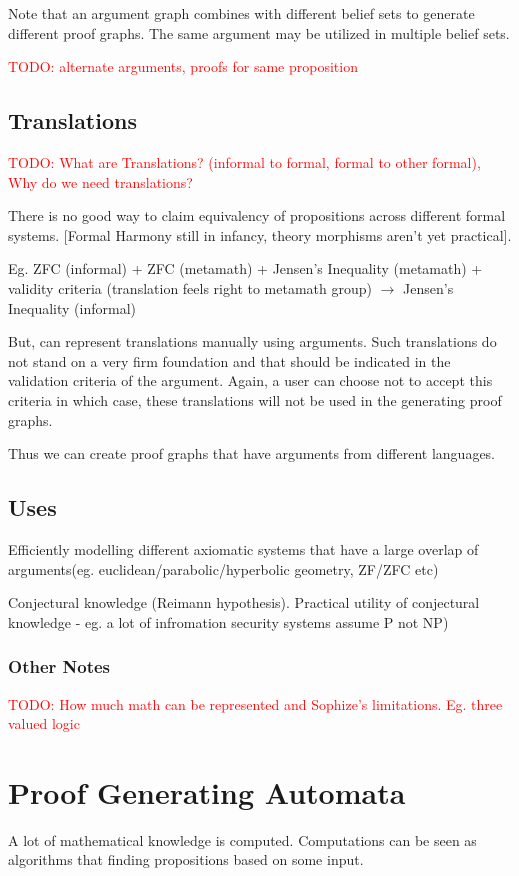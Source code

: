 \documentclass[a4paper]{article}
\newcommand\todo[1]{\textcolor{red}{TODO: #1}}
\begin{document}
Note that an argument graph combines with different belief sets to generate different proof graphs. The same argument may be utilized in multiple belief sets.

\todo{alternate arguments, proofs for same proposition}

\subsection{Translations}
\todo{What are Translations? (informal to formal, formal to other formal), Why do we need translations?}

There is no good way to claim equivalency of propositions across different formal systems. [Formal Harmony still in infancy, theory morphisms aren't yet practical].


Eg. ZFC (informal) + ZFC (metamath) + Jensen's Inequality (metamath) + validity criteria (translation feels right to metamath group) $\rightarrow$ 
Jensen's Inequality (informal)

But, can represent translations manually using arguments. Such translations do not stand on a very firm foundation and that should be indicated in the validation criteria of the argument. Again, a user can choose not to accept this criteria in which case, these translations will not be used in the generating proof graphs.


Thus we can create proof graphs that have arguments from different languages.

\subsection{Uses}
Efficiently modelling different axiomatic systems that have a large overlap of arguments(eg. euclidean/parabolic/hyperbolic geometry, ZF/ZFC etc)

Conjectural knowledge (Reimann hypothesis). 
Practical utility of conjectural knowledge - eg. a lot of infromation security systems assume  P not NP)

\subsubsection{Other Notes}
\todo{How much math can be represented and Sophize's limitations. Eg. three valued logic}


\section{Proof Generating Automata}
A lot of mathematical knowledge is computed. Computations can be seen as algorithms that finding propositions based on some input.
\end{document}

